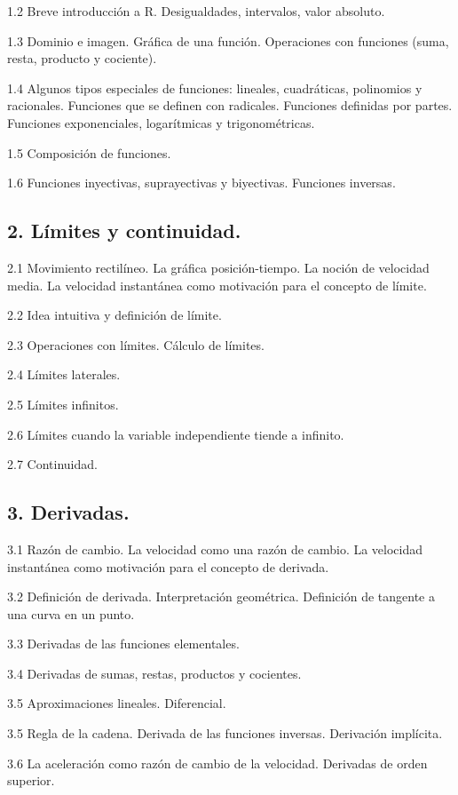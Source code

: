 \documentclass[]{book}
\begin{document}
1.2 Breve introducción a R. Desigualdades, intervalos, valor absoluto.

1.3 Dominio e imagen. Gráfica de una función. Operaciones con funciones
(suma, resta, producto y cociente).

1.4 Algunos tipos especiales de funciones: lineales, cuadráticas,
polinomios y racionales. Funciones que se definen con radicales.
Funciones definidas por partes. Funciones exponenciales, logarítmicas y
trigonométricas.

1.5 Composición de funciones.

1.6 Funciones inyectivas, suprayectivas y biyectivas. Funciones
inversas.

\subsection*{2. Límites y continuidad. }

2.1 Movimiento rectilíneo. La gráfica posición-tiempo. La noción de
velocidad media. La velocidad instantánea como motivación para el
concepto de límite.

2.2 Idea intuitiva y definición de límite.

2.3 Operaciones con límites. Cálculo de límites.

2.4 Límites laterales.

2.5 Límites infinitos.

2.6 Límites cuando la variable independiente tiende a infinito.

2.7 Continuidad.

\subsection*{3. Derivadas. }

3.1 Razón de cambio. La velocidad como una razón de cambio. La velocidad
instantánea como motivación para el concepto de derivada.

3.2 Definición de derivada. Interpretación geométrica. Definición de
tangente a una curva en un punto.

3.3 Derivadas de las funciones elementales.

3.4 Derivadas de sumas, restas, productos y cocientes.

3.5 Aproximaciones lineales. Diferencial.

3.5 Regla de la cadena. Derivada de las funciones inversas. Derivación
implícita.

3.6 La aceleración como razón de cambio de la velocidad. Derivadas de
orden superior.
\end{document}
